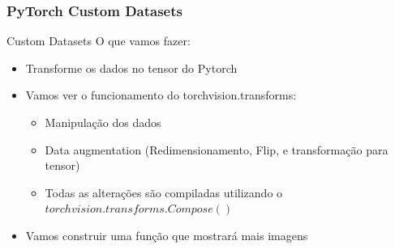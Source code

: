 \documentclass{beamer}
\begin{document}
\begin{frame}
	\frametitle{PyTorch Custom Datasets}
	\begin{block}{Custom Datasets}
		O que vamos fazer:
		\begin{itemize}
			\item Transforme os dados no tensor do Pytorch
			\item Vamos ver o funcionamento do torchvision.transforms:
			\begin{itemize}
				\item Manipulação dos dados
				\item Data augmentation (Redimensionamento, Flip, e transformação para tensor)
				\item Todas as alterações são compiladas utilizando o $torchvision.transforms.Compose()$
			\end{itemize}
			\item Vamos construir uma função que mostrará mais imagens
		\end{itemize}
	\end{block}
\end{frame}
\end{document}
